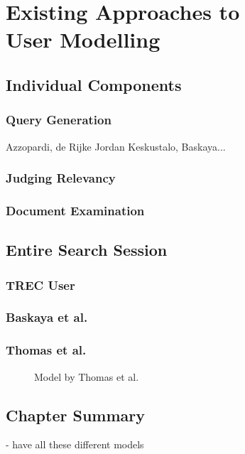 
\chapter[Existing Approaches to User Modelling]{Existing Approaches to\\User Modelling}

\section{Individual Components}

\subsection{Query Generation}
Azzopardi, de Rijke
Jordan
Keskustalo, Baskaya...

\subsection{Judging Relevancy}

\subsection{Document Examination}

\section{Entire Search Session}

\subsection{TREC User}

\subsection{Baskaya et al.}

\subsection{Thomas et al.}
\begin{figure}[ht]
	\centering

	\caption[Interaction model by Thomas et al.]{Model by Thomas et al.}

	\label{fig:ch4-thomas_model}
\end{figure}

\section{Chapter Summary}
- have all these different models